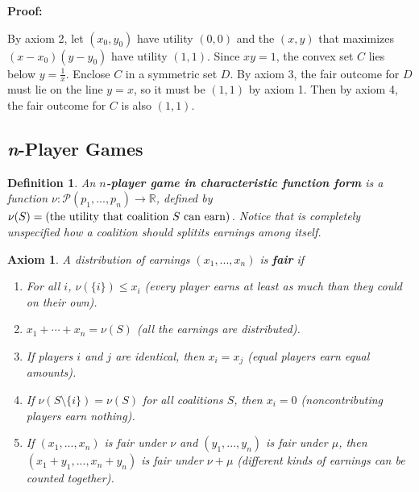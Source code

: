 \documentclass{article}
\theoremstyle{colontheorem}
\newtheorem{definition}[theorem]{Definition}
\newtheorem{axiom}[theorem]{Axiom}
\newenvironment{Def}
{
	\begin{mdframed}[backgroundcolor=DefGreen!10]
	\begin{definition}
}
{
	\end{definition}
	\end{mdframed}
	
	\vspace{.15in}
}
\newenvironment{Axiom}
{
	\begin{mdframed}[backgroundcolor=AxiomRed!10]
	\begin{axiom}
}
{
	\end{axiom}
	\end{mdframed}
	
	\vspace{.15in}
}
\newenvironment{Proof}
{
	\vspace{-.3in}
	
	\begin{mdframed}[backgroundcolor=ProofPurple!10]
	\textbf{Proof:}%
}
{
	\end{mdframed}
	
	\vspace{.15in}
}
\begin{document}
\begin{Proof}
	By axiom 2, let $(x_0, y_0)$ have utility $(0, 0)$ and the $(x, y)$ that maximizes $(x - x_0)(y - y_0)$ have utility $(1, 1)$. Since $xy = 1$, the convex set $C$ lies below $y = \frac{1}{x}$. Enclose $C$ in a symmetric set $D$. By axiom 3, the fair outcome for $D$ must lie on the line $y = x$, so it must be $(1, 1)$ by axiom 1. Then by axiom 4, the fair outcome for $C$ is also $(1, 1)$.
	
\end{Proof}





\begin{center}
	\pagebreak
	
	\section{\textit{n}-Player Games}
	
	\vspace{.1in}
\end{center}



\begin{Def}
	
	An \textbf{$n$-player game in characteristic function form} is a function $\nu : \mathcal{P}(p_1, ..., p_n) \longrightarrow \mathbb{R}$, defined by $\nu(S) = (\textnormal{the utility that coalition } S \textnormal{ can earn})$. Notice that is completely unspecified how a coalition should splitits earnings among itself.
	
\end{Def}



\begin{Axiom}
	
	A distribution of earnings $(x_1, ..., x_n)$ is \textbf{fair} if
	
	\begin{enumerate}
		
		\item For all $i$, $\nu(\{i\}) \leq x_i$ (every player earns at least as much than they could on their own).
		
		\item $x_1 + \cdots + x_n = \nu(S)$ (all the earnings are distributed).
		
		\item If players $i$ and $j$ are identical, then $x_i = x_j$ (equal players earn equal amounts).
		
		\item If $\nu(S \setminus \{i\}) = \nu(S)$ for all coalitions $S$, then $x_i = 0$ (noncontributing players earn nothing).
		
		\item If $(x_1, ..., x_n)$ is fair under $\nu$ and $(y_1, ..., y_n)$ is fair under $\mu$, then $(x_1 + y_1, ..., x_n + y_n)$ is fair under $\nu + \mu$ (different kinds of earnings can be counted together).
		
	\end{enumerate}
	
\end{Axiom}
\end{document}
